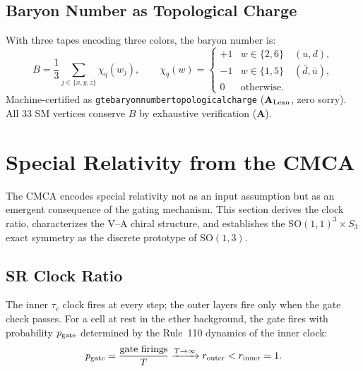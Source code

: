 \documentclass[11pt]{article}
\theoremstyle{remark}
\newcommand{\lean}[1]{%
  \penalty-100
  \begingroup\def\_{\textunderscore\allowbreak}\texttt{#1}\endgroup}
\newcommand{\CatA}{\textbf{A}}
\newcommand{\CatAL}{\ensuremath{\textbf{A}_{\rm Lean}}}
\newcommand{\CMCA}{\text{CMCA}}
\newcommand{\tauc}{\tau_c}
\begin{document}
\subsection{Baryon Number as Topological Charge}

With three tapes encoding three colors, the baryon number is:
\begin{equation}
  B = \frac{1}{3}\sum_{j \in \{x,y,z\}} \chi_q(w_j),
  \qquad
  \chi_q(w) = \begin{cases}
    +1 & w \in \{2, 6\} \quad (u, d), \\
    -1 & w \in \{1, 5\} \quad (\bar{d}, \bar{u}), \\
    0  & \text{otherwise.}
  \end{cases}
\end{equation}
Machine-certified as \lean{gte\_baryon\_number\_topological\_charge}
($\CatAL$, zero sorry). All 33 SM vertices
conserve $B$ by exhaustive verification ($\CatA$).

\FloatBarrier

\section{Special Relativity from the CMCA}
\label{sec:sr}

The $\CMCA$ encodes special relativity not as an input assumption but as an
emergent consequence of the gating mechanism. This section derives the clock
ratio, characterizes the V--A chiral structure, and establishes the
SO$(1,1)^3 \times S_3$ exact symmetry as the discrete prototype of
SO$(1,3)$.

\subsection{SR Clock Ratio}

The inner $\tauc$ clock fires at every step; the outer layers fire only
when the gate check passes. For a cell at rest in the ether background, the
gate fires with probability $p_{\rm gate}$ determined by the Rule~110
dynamics of the inner clock:
\begin{equation}
  p_{\rm gate} = \frac{\text{gate firings}}{T}
  \xrightarrow{T \to \infty} r_{\rm outer} < r_{\rm inner} = 1.
\end{equation}
\end{document}
